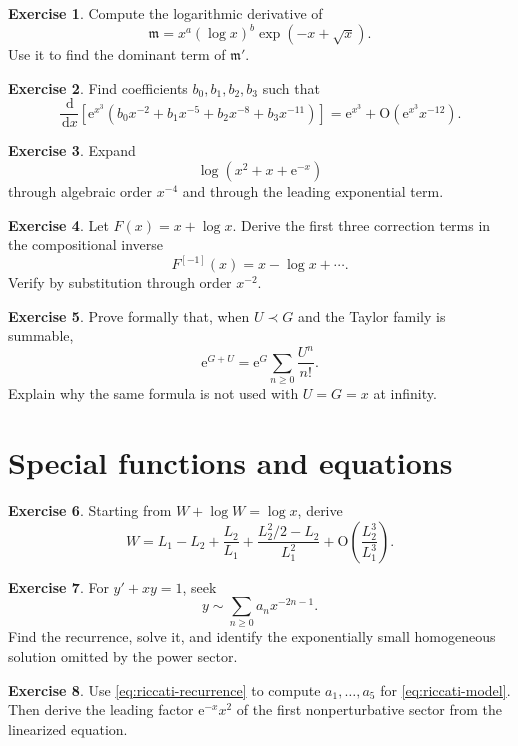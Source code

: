 \documentclass[11pt,openany]{book}
\theoremstyle{plain}
\theoremstyle{definition}
\newtheorem{exercise}{Exercise}[chapter]
\theoremstyle{remark}
\newcommand{\m}{\mathfrak{m}}
\newcommand{\bigO}{\mathrm{O}}
\newcommand{\dd}{\,\mathrm{d}}
\newcommand{\e}{\mathrm{e}}
\begin{document}
\begin{exercise}
Compute the logarithmic derivative of
\[
  \m=x^a(\log x)^b
  \exp\left(-x+\sqrt{x}\right).
\]
Use it to find the dominant term of $\m'$.
\end{exercise}

\begin{exercise}
Find coefficients $b_0,b_1,b_2,b_3$ such that
\[
  \frac{\dd}{\dd x}\left[
  \e^{x^3}\left(
  b_0x^{-2}+b_1x^{-5}+b_2x^{-8}+b_3x^{-11}
  \right)\right]
  =\e^{x^3}+\bigO(\e^{x^3}x^{-12}).
\]
\end{exercise}

\begin{exercise}
Expand
\[
  \log\left(x^2+x+\e^{-x}\right)
\]
through algebraic order $x^{-4}$ and through the leading exponential term.
\end{exercise}

\begin{exercise}
Let $F(x)=x+\log x$. Derive the first three correction terms in the compositional inverse
\[
  F^{[-1]}(x)=x-\log x+\cdots.
\]
Verify by substitution through order $x^{-2}$.
\end{exercise}

\begin{exercise}
Prove formally that, when $U\prec G$ and the Taylor family is summable,
\[
  \e^{G+U}=\e^G\sum_{n\ge0}\frac{U^n}{n!}.
\]
Explain why the same formula is not used with $U=G=x$ at infinity.
\end{exercise}

\section{Special functions and equations}

\begin{exercise}
Starting from $W+\log W=\log x$, derive
\[
  W=L_1-L_2+\frac{L_2}{L_1}
  +\frac{L_2^2/2-L_2}{L_1^2}
  +\bigO\left(\frac{L_2^3}{L_1^3}\right).
\]
\end{exercise}

\begin{exercise}
For $y'+xy=1$, seek
\[
  y\sim\sum_{n\ge0}a_nx^{-2n-1}.
\]
Find the recurrence, solve it, and identify the exponentially small homogeneous solution omitted by the power sector.
\end{exercise}

\begin{exercise}
Use \cref{eq:riccati-recurrence} to compute $a_1,\ldots,a_5$ for \cref{eq:riccati-model}. Then derive the leading factor $\e^{-x}x^2$ of the first nonperturbative sector from the linearized equation.
\end{exercise}
\end{document}
